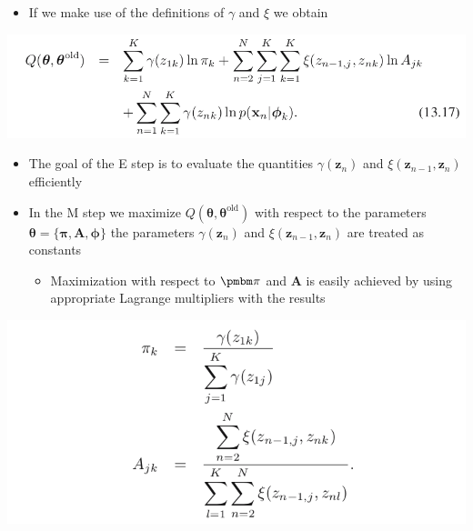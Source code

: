 \documentclass[11pt]{article}
\begin{document}
\begin{itemize}
\item If we make use of the definitions of \(\gamma\) and \(\xi\) we obtain
\end{itemize}
\begin{center}
\includegraphics[width=.9\linewidth]{Sequential Data/screenshot_2018-11-04_09-38-18.png}
\end{center}
\begin{itemize}
\item The goal of the E step is to evaluate the quantities \(\gamma(\pmb z_n)\) and \(\xi(\pmb z_{n-1}, \pmb z_n)\) efficiently

\item In the M step we maximize \(Q(\pmb \theta, \pmb \theta^\text{old})\) with respect to the parameters \(\pmb \theta = \{\pmb \pi, \pmb A, \pmb \phi\}\) the parameters \(\gamma(\pmb z_n)\) and \(\xi(\pmb z_{n-1}, \pmb z_n)\) are treated as constants
\begin{itemize}
\item Maximization with respect to \(\pmbm \pi\) and \(\pmb A\) is easily achieved by using appropriate Lagrange multipliers with the results
\end{itemize}
\end{itemize}
\begin{center}
\includegraphics[width=.9\linewidth]{Sequential Data/screenshot_2018-11-04_09-46-05.png}
\end{center}
\end{document}
